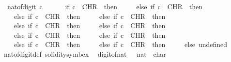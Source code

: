 \begin{isabellebody}
\ \ {\isacartoucheopen}nat{\isacharunderscore}{\kern0pt}of{\isacharunderscore}{\kern0pt}digit\ c\ {\isacharequal}{\kern0pt}\ \isanewline
\ \ \ \ {\isacharparenleft}{\kern0pt}if\ c\ {\isacharequal}{\kern0pt}\ CHR\ {\isacharprime}{\kern0pt}{\isacharprime}{\kern0pt}{}{\isacharprime}{\kern0pt}{\isacharprime}{\kern0pt}\ then\ {}\isanewline
\ \ \ \ else\ if\ c\ {\isacharequal}{\kern0pt}\ CHR\ {\isacharprime}{\kern0pt}{\isacharprime}{\kern0pt}{}{\isacharprime}{\kern0pt}{\isacharprime}{\kern0pt}\ then\ {}\isanewline
\ \ \ \ else\ if\ c\ {\isacharequal}{\kern0pt}\ CHR\ {\isacharprime}{\kern0pt}{\isacharprime}{\kern0pt}{}{\isacharprime}{\kern0pt}{\isacharprime}{\kern0pt}\ then\ {}\isanewline
\ \ \ \ else\ if\ c\ {\isacharequal}{\kern0pt}\ CHR\ {\isacharprime}{\kern0pt}{\isacharprime}{\kern0pt}{}{\isacharprime}{\kern0pt}{\isacharprime}{\kern0pt}\ then\ {}\isanewline
\ \ \ \ else\ if\ c\ {\isacharequal}{\kern0pt}\ CHR\ {\isacharprime}{\kern0pt}{\isacharprime}{\kern0pt}{}{\isacharprime}{\kern0pt}{\isacharprime}{\kern0pt}\ then\ {}\isanewline
\ \ \ \ else\ if\ c\ {\isacharequal}{\kern0pt}\ CHR\ {\isacharprime}{\kern0pt}{\isacharprime}{\kern0pt}{}{\isacharprime}{\kern0pt}{\isacharprime}{\kern0pt}\ then\ {}\isanewline
\ \ \ \ else\ if\ c\ {\isacharequal}{\kern0pt}\ CHR\ {\isacharprime}{\kern0pt}{\isacharprime}{\kern0pt}{}{\isacharprime}{\kern0pt}{\isacharprime}{\kern0pt}\ then\ {}\isanewline
\ \ \ \ else\ if\ c\ {\isacharequal}{\kern0pt}\ CHR\ {\isacharprime}{\kern0pt}{\isacharprime}{\kern0pt}{}{\isacharprime}{\kern0pt}{\isacharprime}{\kern0pt}\ then\ {}\isanewline
\ \ \ \ else\ if\ c\ {\isacharequal}{\kern0pt}\ CHR\ {\isacharprime}{\kern0pt}{\isacharprime}{\kern0pt}{}{\isacharprime}{\kern0pt}{\isacharprime}{\kern0pt}\ then\ {}\isanewline
\ \ \ \ else\ if\ c\ {\isacharequal}{\kern0pt}\ CHR\ {\isacharprime}{\kern0pt}{\isacharprime}{\kern0pt}{}{\isacharprime}{\kern0pt}{\isacharprime}{\kern0pt}\ then\ {}\isanewline
\ \ \ \ else\ undefined{\isacharparenright}{\kern0pt}{\isacartoucheclose}\isanewline
\isanewline
{}\isamarkupfalse%
\ nat{\isacharunderscore}{\kern0pt}of{\isacharunderscore}{\kern0pt}digit{\isacharunderscore}{\kern0pt}def\ {\isacharbrackleft}{\kern0pt}solidity{\isacharunderscore}{\kern0pt}symbex{\isacharbrackright}{\kern0pt}\isanewline
\isanewline
{}\isamarkupfalse%
\ \ digit{\isacharunderscore}{\kern0pt}of{\isacharunderscore}{\kern0pt}nat\ {\isacharcolon}{\kern0pt}{\isacharcolon}{\kern0pt}\ \ {\isacartoucheopen}nat\ {\isasymRightarrow}\ char{\isacartoucheclose}\ \isanewline

\end{isabellebody}
